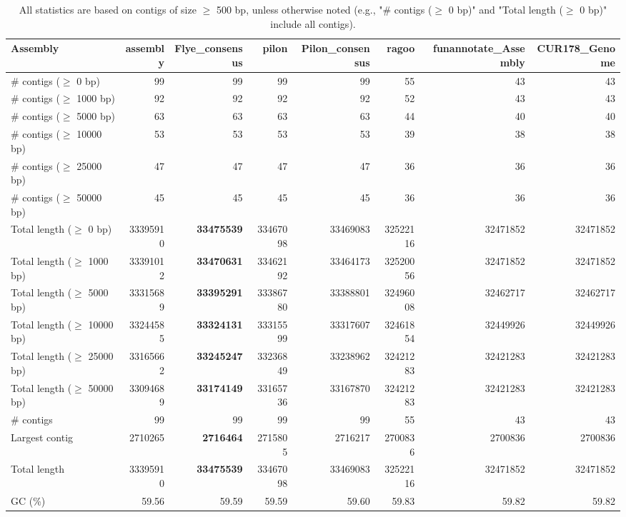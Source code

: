 \documentclass[12pt,a4paper]{article}
\begin{document}
\begin{table}[ht]
\begin{center}
\caption{All statistics are based on contigs of size $\geq$ 500 bp, unless otherwise noted (e.g., "\# contigs ($\geq$ 0 bp)" and "Total length ($\geq$ 0 bp)" include all contigs).}
\begin{tabular}{|l*{7}{|r}|}
\hline
Assembly & assembly & Flye\_consensus & pilon & Pilon\_consensus & ragoo & funannotate\_Assembly & CUR178\_Genome \\ \hline
\# contigs ($\geq$ 0 bp) & 99 & 99 & 99 & 99 & 55 & 43 & 43 \\ \hline
\# contigs ($\geq$ 1000 bp) & 92 & 92 & 92 & 92 & 52 & 43 & 43 \\ \hline
\# contigs ($\geq$ 5000 bp) & 63 & 63 & 63 & 63 & 44 & 40 & 40 \\ \hline
\# contigs ($\geq$ 10000 bp) & 53 & 53 & 53 & 53 & 39 & 38 & 38 \\ \hline
\# contigs ($\geq$ 25000 bp) & 47 & 47 & 47 & 47 & 36 & 36 & 36 \\ \hline
\# contigs ($\geq$ 50000 bp) & 45 & 45 & 45 & 45 & 36 & 36 & 36 \\ \hline
Total length ($\geq$ 0 bp) & 33395910 & {\bf 33475539} & 33467098 & 33469083 & 32522116 & 32471852 & 32471852 \\ \hline
Total length ($\geq$ 1000 bp) & 33391012 & {\bf 33470631} & 33462192 & 33464173 & 32520056 & 32471852 & 32471852 \\ \hline
Total length ($\geq$ 5000 bp) & 33315689 & {\bf 33395291} & 33386780 & 33388801 & 32496008 & 32462717 & 32462717 \\ \hline
Total length ($\geq$ 10000 bp) & 33244585 & {\bf 33324131} & 33315599 & 33317607 & 32461854 & 32449926 & 32449926 \\ \hline
Total length ($\geq$ 25000 bp) & 33165662 & {\bf 33245247} & 33236849 & 33238962 & 32421283 & 32421283 & 32421283 \\ \hline
Total length ($\geq$ 50000 bp) & 33094689 & {\bf 33174149} & 33165736 & 33167870 & 32421283 & 32421283 & 32421283 \\ \hline
\# contigs & 99 & 99 & 99 & 99 & 55 & 43 & 43 \\ \hline
Largest contig & 2710265 & {\bf 2716464} & 2715805 & 2716217 & 2700836 & 2700836 & 2700836 \\ \hline
Total length & 33395910 & {\bf 33475539} & 33467098 & 33469083 & 32522116 & 32471852 & 32471852 \\ \hline
GC (\%) & 59.56 & 59.59 & 59.59 & 59.60 & 59.83 & 59.82 & 59.82 \\ \hline

\end{tabular}
\end{center}
\end{table}
\end{document}

